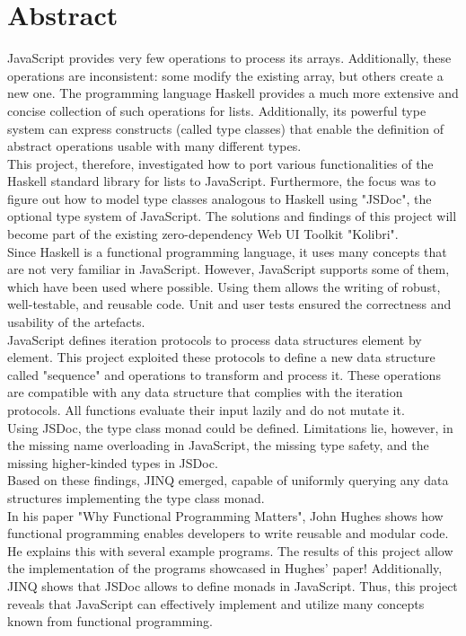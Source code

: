 \chapter*{Abstract}
JavaScript provides very few operations to process its arrays.
Additionally, these operations are inconsistent: some modify the existing
array, but others create a new one. The programming language Haskell provides a
much more extensive and concise collection of such operations for
lists. Additionally, its powerful type system can express
constructs (called type classes) that enable the definition of abstract
operations usable with many different types.\\ 
This project, therefore, investigated how to port various functionalities of
the Haskell standard library for lists to JavaScript. Furthermore, the focus
was to figure out how to model type classes analogous to Haskell using "JSDoc",
the optional type system of JavaScript. The solutions and
findings of this project will become part of the existing zero-dependency Web
UI Toolkit "Kolibri". \\
Since Haskell is a functional programming language, it uses many concepts that
are not very familiar in JavaScript. However, JavaScript supports some of them,
which have been used where possible. Using them allows the writing
of robust, well-testable, and reusable code. Unit and user tests ensured the
correctness and usability of the artefacts. \\
JavaScript defines iteration protocols to process data structures element by
element. This project exploited these protocols to define a new data structure
called "sequence" and operations to transform and process it. These operations
are compatible with any data structure that complies with the iteration
protocols. All functions evaluate their input lazily and do not mutate it.\\
Using JSDoc, the type class monad could be defined. Limitations lie, however,
in the missing name overloading in JavaScript, the missing type safety, and the
missing higher-kinded types in JSDoc.\\
Based on these findings, JINQ emerged, capable of uniformly querying any data
structures implementing the type class monad.\\
In his paper "Why Functional Programming Matters", John Hughes shows how
functional programming enables developers to write reusable and modular
code. He explains this with several example programs.
The results of this project allow the implementation of the programs showcased
in Hughes' paper! Additionally, JINQ shows that JSDoc allows to define
monads in JavaScript. Thus, this project reveals that JavaScript can
effectively implement and utilize many concepts known from functional
programming.
